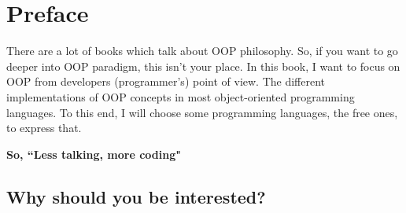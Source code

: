 \documentclass[12pt]{book}
\begin{document}
\fi

\chapter*{Preface}

{
\merienda

There are a lot of books which talk about OOP philosophy.
So, if you want to go deeper into OOP paradigm, this isn't your place.
In this book, I want to focus on OOP from developers (programmer's) point of view.
The different implementations of OOP concepts in most object-oriented programming languages.
To this end, I will choose some programming languages, the free ones, to express that.


}
\vfill
\begin{flushright}
	\LARGE\bfseries
So, ``Less talking, more coding"
\end{flushright}

\newpage

\section*{Why should you be interested?}
\end{document}
